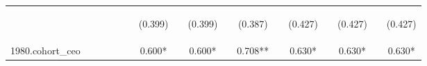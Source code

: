\begin{center}
\begin{tabular}{lcccccccccccccccc}
\vspace{4pt} & \begin{footnotesize}\end{footnotesize} & \begin{footnotesize}\end{footnotesize} & \begin{footnotesize}\end{footnotesize} & \begin{footnotesize}\end{footnotesize} & \begin{footnotesize}\end{footnotesize} & \begin{footnotesize}(0.399)\end{footnotesize} & \begin{footnotesize}\end{footnotesize} & \begin{footnotesize}(0.399)\end{footnotesize} & \begin{footnotesize}\end{footnotesize} & \begin{footnotesize}(0.387)\end{footnotesize} & \begin{footnotesize}\end{footnotesize} & \begin{footnotesize}(0.427)\end{footnotesize} & \begin{footnotesize}\end{footnotesize} & \begin{footnotesize}(0.427)\end{footnotesize} & \begin{footnotesize}\end{footnotesize} & \begin{footnotesize}(0.427)\end{footnotesize} \\
1980.cohort\_ceo &  &  &  &  &  & 0.600* &  & 0.600* &  & 0.708** &  & 0.630* &  & 0.630* &  & 0.630* \\

\end{tabular}
\end{center}
